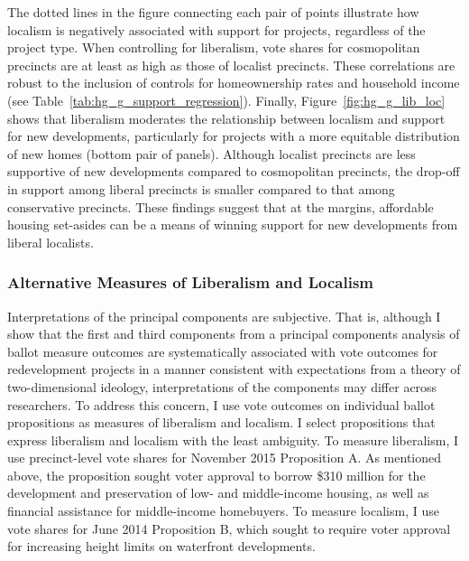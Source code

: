 \documentclass[article,12pt]{memoir}
\begin{document}
The dotted lines in the figure connecting each pair of points illustrate how localism is negatively associated with support for projects, regardless of the project type.  When controlling for liberalism, vote shares for cosmopolitan precincts are at least as high as those of localist precincts.  These correlations are robust to the inclusion of controls for homeownership rates and household income (see Table~\ref{tab:hg_g_support_regression}). Finally, Figure~\ref{fig:hg_g_lib_loc} shows that liberalism moderates the relationship between localism and support for new developments, particularly for projects with a more equitable distribution of new homes (bottom pair of panels). Although localist precincts are less supportive of new developments compared to cosmopolitan precincts, the drop-off in support among liberal precincts is smaller compared to that among conservative precincts. These findings suggest that at the margins, affordable housing set-asides can be a means of winning support for new developments from liberal localists.

\subsubsection{Alternative Measures of Liberalism and Localism}

Interpretations of the principal components are subjective. That is, although I show that the first and third components from a principal components analysis of ballot measure outcomes are systematically associated with vote outcomes for redevelopment projects in a manner consistent with expectations from a theory of two-dimensional ideology, interpretations of the components may differ across researchers. To address this concern, I use vote outcomes on individual ballot propositions as measures of liberalism and localism.  I select propositions that express liberalism and localism with the least ambiguity.  To measure liberalism, I use precinct-level vote shares for November 2015 Proposition A. As mentioned above, the proposition sought voter approval to borrow \$310 million for the development and preservation of low- and middle-income housing, as well as financial assistance for middle-income homebuyers. To measure localism, I use vote shares for June 2014 Proposition B, which sought to require voter approval for increasing height limits on waterfront developments.
\end{document}
